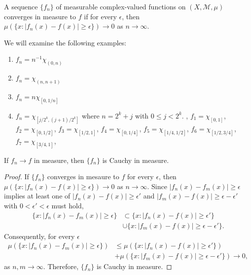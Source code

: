 \begin{definition}
    A sequence $\{ f_n \}$ of measurable complex-valued functions on $(X, \mathcal{M}, \mu)$ converges in measure to $f$ if for every $\epsilon$, then $\mu(\{ x: |f_n(x) - f(x)| \ge \epsilon \}) \to 0$ as $n \to \infty$.
\end{definition}

\begin{example}
    We will examine the following examples:
    \begin{enumerate}
        \item $f_n = n^{-1} \chi_{(0, n)}$
        \item $f_n = \chi_{(n, n+1)}$ 
        \item $f_n = n \chi_{[0, 1/n]}$
        \item $f_n = \chi_{[j/2^k, (j+1)/2^k]}$ where $n = 2^k + j$ with $0 \le j < 2^k$. \eg, $f_1 = \chi_{[0, 1]}$, $f_2 = \chi_{[0, 1/2]}$, $f_3 = \chi_{[1/2, 1]}$, $f_4 = \chi_{[0, 1/4]}$, $f_5 = \chi_{[1/4, 1/2]}$, $f_6 = \chi_{[1/2, 3/4]}$, $f_7 = \chi_{[3/4, 1]}$, \etc
    \end{enumerate}
\end{example}


\begin{proposition}
    If $f_n \to f$ in measure, then $\{ f_n \}$ is Cauchy in measure. 
\end{proposition}

\begin{proof}
    If $\{ f_n \}$ converges in mesaure to $f$ for every $\epsilon$, then $\mu(\{ x: |f_n(x) - f(x)| \ge \epsilon \}) \to 0$ as $n \to \infty$.
    Since $|f_n(x) - f_m(x)| \ge \epsilon$ implies at least one of $|f_n(x) - f(x)| \ge \epsilon'$ and $|f_m(x) - f(x)| \ge \epsilon - \epsilon'$ with $0 < \epsilon' < \epsilon$ must hold, 
    \begin{align}
        \{ x: |f_n(x) - f_m(x)| \ge \epsilon \} & \subset \{ x: |f_n(x) - f(x)| \ge \epsilon' \} \\
        & \cup \{ x: |f_m(x) - f(x)| \ge \epsilon - \epsilon' \}. \nonumber
    \end{align}
    Consequently, for every $\epsilon$
    \begin{align}
        \mu(\{ x: |f_n(x) - f_m(x)| \ge \epsilon \}) & \le \mu(\{ x: |f_n(x) - f(x)| \ge \epsilon' \}) \\
        & + \mu(\{ x: |f_m(x) - f(x)| \ge \epsilon - \epsilon' \}) \to 0, \nonumber
    \end{align}
    as $n, m \to \infty$.
    Therefore, $\{ f_n \}$ is Cauchy in measure.
\end{proof}

